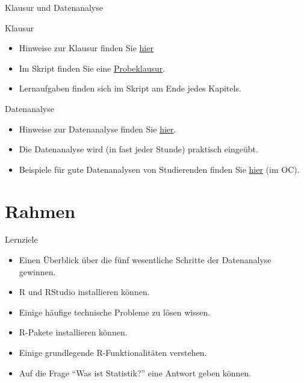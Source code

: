 \begin{frame}{Klausur und Datenanalyse}

\begin{block}{Klausur}

\begin{itemize}
\tightlist
\item
  Hinweise zur Klausur finden Sie
  \href{https://sebastiansauer.github.io/Praxis_der_Datenanalyse/organisatorisches.html\#klausur}{hier}
\item
  Im Skript finden Sie eine
  \href{https://sebastiansauer.github.io/Praxis_der_Datenanalyse/probeklausur.html}{Probeklausur}.
\item
  Lernaufgaben finden sich im Skript am Ende jedes Kapitels.
\end{itemize}

\end{block}

\begin{block}{Datenanalyse}

\begin{itemize}
\tightlist
\item
  Hinweise zur Datenanalyse finden Sie
  \href{https://sebastiansauer.github.io/Praxis_der_Datenanalyse/organisatorisches.html\#klausur}{hier}.
\item
  Die Datenanalyse wird (in fast jeder Stunde) praktisch eingeübt.
\item
  Beispiele für gute Datenanalysen von Studierenden finden Sie
  \href{https://sebastiansauer.github.io/Praxis_der_Datenanalyse/organisatorisches.html\#klausur}{hier}
  (im OC).
\end{itemize}

\end{block}

\end{frame}

\section{Rahmen}\label{rahmen}

\begin{frame}{Lernziele}

\begin{itemize}
\tightlist
\item
  Einen Überblick über die fünf wesentliche Schritte der Datenanalyse
  gewinnen.
\item
  R und RStudio installieren können.
\item
  Einige häufige technische Probleme zu lösen wissen.
\item
  R-Pakete installieren können.
\item
  Einige grundlegende R-Funktionalitäten verstehen.
\item
  Auf die Frage ``Was ist Statistik?'' eine Antwort geben können.
\end{itemize}

\end{frame}

